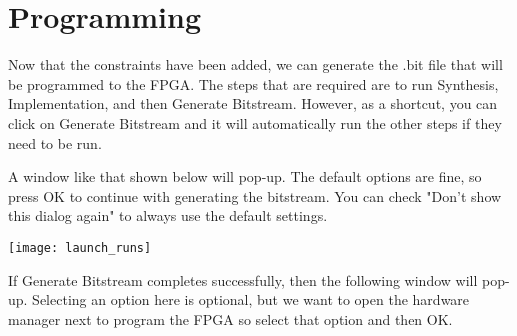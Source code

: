 \section{Programming}
\label{sec:programming}

Now that the constraints have been added, we can generate the .bit file that will be
programmed to the FPGA.
The steps that are required are to run Synthesis, Implementation, and then Generate Bitstream.
However, as a shortcut, you can click on Generate Bitstream and it will automatically run the
other steps if they need to be run.

\begin{center}
\end{center}
\begin{center}
\end{center}

A window like that shown below will pop-up.
The default options are fine, so press OK to continue with generating the bitstream.
You can check "Don't show this dialog again" to always use the default settings.

\begin{center}
    \texttt{[image: launch\_runs]}
\end{center}

If Generate Bitstream completes successfully, then the following window will pop-up.
Selecting an option here is optional, but we want to open the hardware manager next to program
the FPGA so select that option and then OK.

